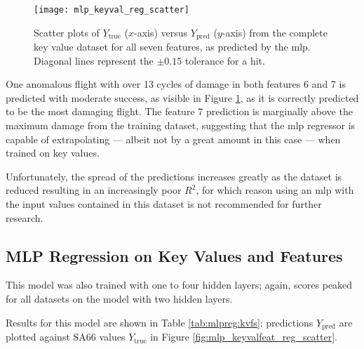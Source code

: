 \begin{figure}[tb!]
    \centering
    \texttt{[image: mlp\_keyval\_reg\_scatter]}
    \caption{\label{fig:mlp_keyval_reg_scatter} Scatter plots of \(Y_\text{true}\) (\(x\)-axis) versus \(Y_\text{pred}\) (\(y\)-axis) from the complete key value dataset for all seven features, as predicted by the \ac{mlp}. Diagonal lines represent the \(\pm0.15\) tolerance for a hit.}
\end{figure}

One anomalous flight with over 13 cycles of damage in both features 6 and 7 is predicted with moderate success, as visible in Figure \ref{fig:mlp_keyval_reg_scatter}, as it is correctly predicted to be the most damaging flight. The feature 7 prediction is marginally above the maximum damage from the training dataset, suggesting that the \ac{mlp} regressor is capable of extrapolating --- albeit not by a great amount in this case --- when trained on key values.

Unfortunately, the spread of the predictions increases greatly as the dataset is reduced resulting in an increasingly poor \(R^2\), for which reason using an \ac{mlp} with the input values contained in this dataset is not recommended for further research.

\subsection{MLP Regression on Key Values and Features} \label{sec:res:mlp_kvfs}
This model was also trained with one to four hidden layers; again, scores peaked for all datasets on the model with two hidden layers.

Results for this model are shown in Table \ref{tab:mlpreg:kvfs}; predictions \(Y_{\text{pred}}\) are plotted against SA66 values \(Y_{\text{true}}\) in Figure \ref{fig:mlp_keyvalfeat_reg_scatter}.

